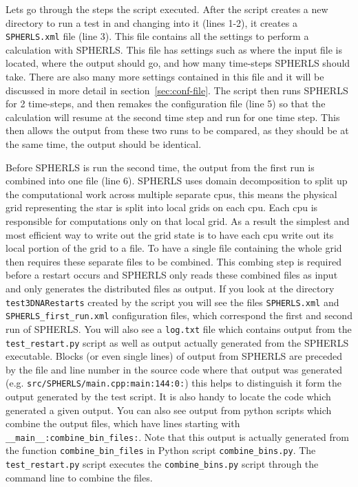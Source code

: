 \documentclass[12pt,a4paper]{book}
\begin{document}
Lets go through the steps the script executed. After the script creates a new directory to run a test in and changing into it (lines 1-2), it creates a {\tt SPHERLS.xml} file (line 3). This file contains all the settings to perform a calculation with SPHERLS. This file has settings such as where the input file is located, where the output should go, and how many time-steps SPHERLS should take. There are also many more settings contained in this file and it will be discussed in more detail in section~\ref{sec:conf-file}. The script then runs SPHERLS for 2 time-steps, and then remakes the configuration file (line 5) so that the calculation will resume at the second time step and run for one time step. This then allows the output from these two runs to be compared, as they should be at the same time, the output should be identical. 

Before SPHERLS is run the second time, the output from the first run is combined into one file (line 6). SPHERLS uses domain decomposition to split up the computational work across multiple separate cpus, this means the physical grid representing the star is split into local grids on each cpu. Each cpu is responsible for computations only on that local grid. As a result the simplest and most efficient way to write out the grid state is to have each cpu write out its local portion of the grid to a file. To have a single file containing the whole grid then requires these separate files to be combined. This combing step is required before a restart occurs and SPHERLS only reads these combined files as input and only generates the distributed files as output. If you look at the directory {\tt test3DNARestarts} created by the script you will see the files {\tt SPHERLS.xml} and {\tt SPHERLS\_first\_run.xml} configuration files, which correspond the first and second run of SPHERLS. You will also see a {\tt log.txt} file which contains output from the {\tt test\_restart.py} script as well as output actually generated from the SPHERLS executable. Blocks (or even single lines) of output from SPHERLS are preceded by the file and line number in the source code where that output was generated (e.g. {\tt src/SPHERLS/main.cpp:main:144:0:}) this helps to distinguish it form the output generated by the test script. It is also handy to locate the code which generated a given output. You can also see output from python scripts which combine the output files, which have lines starting with {\tt \_\_main\_\_:combine\_bin\_files:}. Note that this output is actually generated from the function {\tt combine\_bin\_files} in Python script {\tt combine\_bins.py}. The {\tt test\_restart.py} script executes the {\tt combine\_bins.py} script through the command line to combine the files. 
\end{document}

